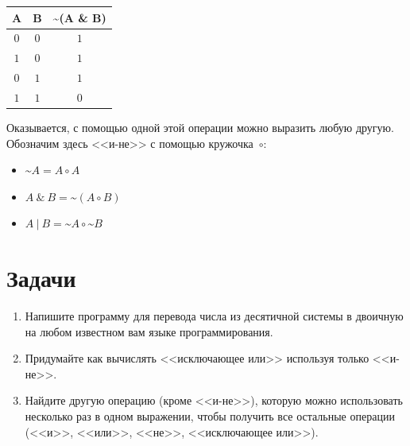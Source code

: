 \begin{center}
\begin{tabular}{|c|c|c|}
 \hline
 \textbf{A} & \textbf{B} & \textbf{\textasciitilde(A \& B)} \\ \hline
 $0$ & $0$ & $1$ \\ \hline
 $1$ & $0$ & $1$ \\ \hline
 $0$ & $1$ & $1$ \\ \hline
 $1$ & $1$ & $0$ \\ \hline
\end{tabular}
\end{center}

Оказывается, с помощью одной этой операции можно выразить любую другую.
Обозначим здесь <<и-не>> с помощью кружочка~$\circ$:

\begin{itemize}
    \item $\mbox{\textasciitilde}A = A \circ A$
    \item $A\ \mbox{\&}\ B = \mbox{\textasciitilde}(A \circ B)$
    \item $A\ |\ B = \mbox{\textasciitilde}A \circ \mbox{\textasciitilde}B$
\end{itemize}


\section{Задачи}

\begin{enumerate}
    \item Напишите программу для перевода числа из десятичной системы в двоичную
          на любом известном вам языке программирования.
    \item Придумайте как вычислять <<исключающее или>> используя только <<и-не>>.
    \item Найдите другую операцию (кроме <<и-не>>), которую можно использовать
          несколько раз в одном выражении, чтобы получить все остальные операции
          (<<и>>, <<или>>, <<не>>, <<исключающее или>>).
\end{enumerate}
